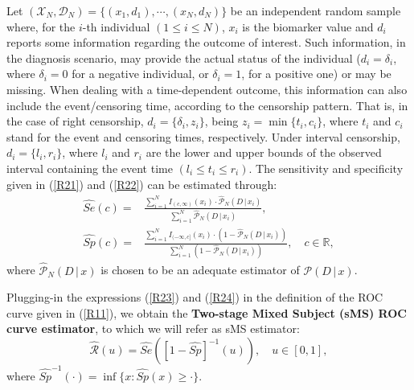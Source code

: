 Let $({\mathcal{X}}_N, {\mathcal{D}}_N) = \{(x_1, d_1), \cdots, (x_N, d_N)\}$ be an independent random sample where, for the $i$-th individual $(1 \leq i \leq N)$, $x_i$ is the biomarker value and $d_i$ reports some information regarding the outcome of interest. Such information, in the diagnosis scenario, may provide the actual status of the individual ($d_i = \delta _i$, where $\delta_i = 0$ for a negative individual, or $\delta_i = 1$, for a positive one) or may be missing. When dealing with a time-dependent outcome, this information can also include the event/censoring time, according to the censorship pattern. That is, in the case of right censorship, $d_i =  \{\delta_i, z_i\}$, being $z_i = \min\{t_i, c_i\}$, where $t_i$ and $c_i$ stand for the event and censoring times, respectively. Under interval censorship, $d_i = \{l_i, r_i\}$, where $l_i$ and $r_i$ are the lower and upper bounds of the observed interval containing the event time $(l_i \leq t_i \leq r_i)$. 
The sensitivity and specificity given in (\ref{R21}) and (\ref{R22}) can be estimated through:
\begin{align}
{\widehat{Se}}(c) = & \frac{{\displaystyle \sum}_{i=1}^N I_{(c,\infty)}(x_i)\cdot {\widehat{\mathcal{P}}_N}(D\,|\,x_i)}{{\displaystyle \sum}_{i=1}^N{\widehat{\mathcal{P}}_N}(D\,|\,x_i)}, \label{R23}\\
{\widehat{Sp}}(c) = & \frac{{\displaystyle \sum}_{i=1}^N I_{(-\infty,c]}(x_i)\cdot (1 - {\widehat{\mathcal{P}}_N}(D\,|\,x_i))}{{\displaystyle \sum}_{i=1}^N(1 - {\widehat{\mathcal{P}}_N}(D\,|\,x_i))}, \label{R24} \quad c \in \mathbb{R},
\end{align}
where ${\widehat{\mathcal{P}}_N}(D\,|\,x)$ is chosen to be an adequate estimator of ${\mathcal{P}}(D\,|\,x)$. 

Plugging-in the expressions (\ref{R23}) and (\ref{R24})  in the definition of the ROC curve given in (\ref{R11}), we obtain the \textbf{Two-stage Mixed Subject (sMS) ROC curve estimator}, to which we will refer as sMS estimator:
\begin{equation*}
{\widehat{\mathcal{R}}}(u) = {\widehat{Se}}\left( [1 - {\widehat{Sp}}]^{-1} (u) \right), \quad u \in [0,1], \label{R25}
\end{equation*}
where  ${\widehat{Sp}}^{-1}(\cdot) = \inf  \{x:{\widehat{Sp}}(x) \geq \cdot \}$.

